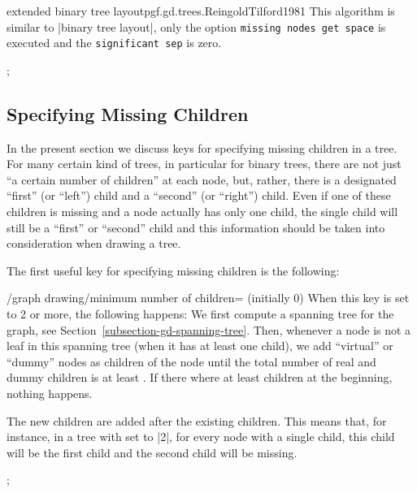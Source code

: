 \begin{gdalgorithm}{extended binary tree layout}{pgf.gd.trees.ReingoldTilford1981}
  This algorithm is similar to |binary tree layout|, only the option
  \texttt{missing nodes get space} is executed and the
  \texttt{significant sep} is zero.
\begin{codeexample}[]
\tikz [grow'=up, extended binary tree layout,
       sibling distance=7mm, level distance=7mm]
;
\end{codeexample}      
\end{gdalgorithm}


\subsection{Specifying Missing Children}

\label{section-gd-missing-children}

In the present section we discuss keys for specifying missing children
in a tree. For many certain kind of trees, in particular for binary
trees, there are not just ``a certain number of children'' at each
node, but, rather, there is a designated ``first'' (or ``left'') child
and a ``second'' (or ``right'') child. Even if one of these children
is missing and a node actually has only one child, the single child will
still be a ``first'' or ``second'' child and this information should
be taken into consideration when drawing a tree.

The first useful key for specifying missing children is the following:
\begin{key}{/graph drawing/minimum number of children=
    (initially 0)}
  When this key is set to 2 or more, the following happens: We first
  compute a spanning tree for the graph, see
  Section~\ref{subsection-gd-spanning-tree}. Then, whenever a node is
  not a leaf in this spanning tree (when it has at least one child),
  we add ``virtual'' or ``dummy'' nodes as children of the node until
  the total number of real and dummy children is at least
  . If there where at least  children at the
  beginning, nothing happens.

  The new children are added after the existing children. This means
  that, for instance, in a tree with  set to |2|, for
  every node with a single child, this child will be the first child
  and the second child will be missing.
\begin{codeexample}[]
\tikz {};  
\end{codeexample}
\end{key}

